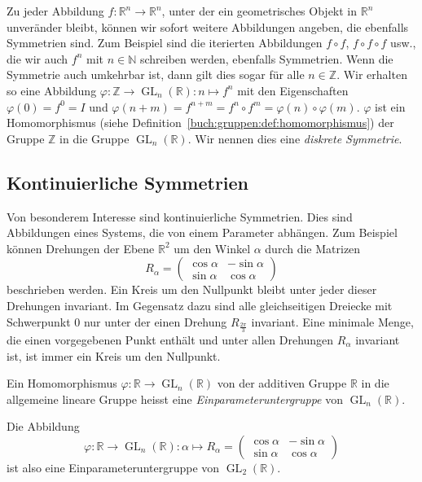 Zu jeder Abbildung $f\colon\mathbb{R}^n\to\mathbb{R}^n$, unter der 
ein geometrisches Objekt in $\mathbb{R}^n$ unveränder bleibt, können wir
sofort weitere Abbildungen angeben, die ebenfalls Symmetrien sind.
Zum Beispiel sind die iterierten Abbildungen $f\circ f$, $f\circ f\circ f$
usw., die wir auch $f^n$ mit $n\in\mathbb{N}$ schreiben werden,
ebenfalls Symmetrien.
Wenn die Symmetrie auch umkehrbar ist, dann gilt dies sogar für alle
$n\in\mathbb{Z}$.
Wir erhalten so eine Abbildung
$\varphi\colon \mathbb{Z}\to \operatorname{GL}_n(\mathbb{R}):n\mapsto f^n$
mit den Eigenschaften $\varphi(0)=f^0 = I$ und
$\varphi(n+m)=f^{n+m}=f^n\circ f^m = \varphi(n)\circ\varphi(m)$.
$\varphi$ ist ein Homomorphismus (siehe
Definition~\ref{buch:gruppen:def:homomorphismus})
der Gruppe $\mathbb{Z}$ in die Gruppe
$\operatorname{GL}_n(\mathbb{R})$.
Wir nennen dies eine {\em diskrete Symmetrie}.

\subsection{Kontinuierliche Symmetrien
\label{buch:subsection:kontinuierliche-symmetrien}}
Von besonderem Interesse sind kontinuierliche Symmetrien.
Dies sind Abbildungen eines Systems, die von einem Parameter
abhängen.
Zum Beispiel können Drehungen der Ebene $\mathbb{R}^2$ um den
Winkel $\alpha$ durch die Matrizen 
\[
R_{\alpha}
=
\begin{pmatrix}
\cos\alpha&-\sin\alpha\\
\sin\alpha& \cos\alpha
\end{pmatrix}
\]
beschrieben werden.
Ein Kreis um den Nullpunkt bleibt unter jeder dieser Drehungen invariant.
Im Gegensatz dazu sind alle gleichseitigen Dreiecke mit Schwerpunkt $0$
nur unter der einen Drehung $R_{\frac{2\pi}3}$ invariant.
Eine minimale Menge, die einen vorgegebenen Punkt enthält und unter
allen Drehungen $R_\alpha$ invariant ist, ist immer ein Kreis um
den Nullpunkt.

\begin{definition}
\label{buch:lie:def:einparameteruntergruppe}
Ein Homomorphismus $\varphi\colon\mathbb{R}\to\operatorname{GL}_n(\mathbb{R})$
von der additiven Gruppe $\mathbb{R}$ in die allgemeine lineare Gruppe
heisst eine {\em Einparameteruntergruppe} von
$\operatorname{GL}_n(\mathbb{R})$.
\end{definition}

Die Abbildung 
\[
\varphi
\colon
\mathbb{R}\to\operatorname{GL}_n(\mathbb{R})
:
\alpha \mapsto
R_{\alpha}
=
\begin{pmatrix}
\cos\alpha&-\sin\alpha\\
\sin\alpha& \cos\alpha
\end{pmatrix}
\]
ist also eine Einparameteruntergruppe von $\operatorname{GL}_2(\mathbb{R})$.

